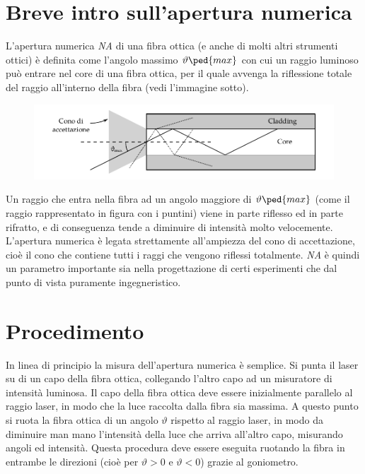 \section{Breve intro sull'apertura numerica}

L'apertura numerica \emph{NA} di una fibra ottica (e anche di molti altri strumenti ottici) è definita come l'angolo massimo $\vartheta\ped{max}$
con cui un raggio luminoso può entrare nel core di una fibra ottica, per il quale avvenga la riflessione totale del raggio all'interno
della fibra (vedi l'immagine sotto).

\begin{figure}[h]
    \includegraphics[width=160mm]{fiber.pdf}
\end{figure}

Un raggio che entra nella fibra ad un angolo maggiore di $\vartheta\ped{max}$ (come il raggio rappresentato in figura con i puntini)
viene in parte riflesso ed in parte rifratto, e di conseguenza tende a diminuire di intensità molto velocemente.
L'apertura numerica è legata strettamente all'ampiezza del cono di accettazione, cioè il cono che contiene tutti i raggi che vengono
riflessi totalmente. \emph{NA} è quindi un parametro importante sia nella progettazione di certi esperimenti che dal punto
di vista puramente ingegneristico.

\section{Procedimento}

In linea di principio la misura dell'apertura numerica è semplice. Si punta il laser su di un capo della fibra ottica, collegando
l'altro capo ad un misuratore di intensità luminosa. Il capo della fibra ottica deve essere inizialmente parallelo al raggio laser,
in modo che la luce raccolta dalla fibra sia massima. A questo punto si ruota la fibra ottica di un angolo $\vartheta$ rispetto al raggio laser,
in modo da diminuire man mano l'intensità della luce che arriva all'altro capo, misurando angoli ed intensità. Questa procedura
deve essere eseguita ruotando la fibra in entrambe le direzioni (cioè per $\vartheta > 0$ e $\vartheta < 0$) grazie al goniometro.

